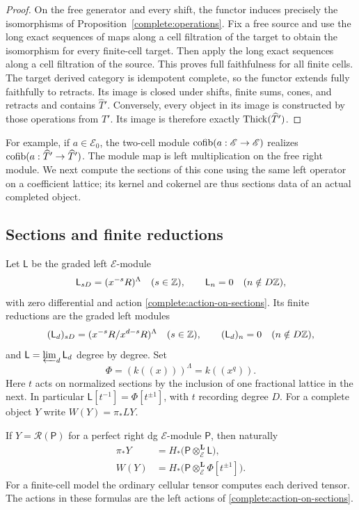 \begin{proof}
On the free generator and every shift, the functor induces precisely
the isomorphisms of Proposition~\ref{complete:operations}. Fix a free
source and use the long exact sequences of maps along a cell filtration
of the target to obtain the isomorphism for every finite-cell target.
Then apply the long exact sequences along a cell filtration of the
source. This proves full faithfulness for all finite cells.
The target derived category is idempotent complete, so the functor
extends fully faithfully to retracts. Its image is closed under shifts,
finite sums, cones, and retracts and contains $\widehat T'$. Conversely,
every object in its image is constructed by those operations from
$\widehat T'$. Its image is therefore exactly
$\operatorname{Thick}(\widehat T')$.
\end{proof}

For example, if $a\in\mathscr E_0$, the two-cell module
$\operatorname{cofib}(a:\mathscr E\to\mathscr E)$ realizes
$\operatorname{cofib}(a:\widehat T'\to\widehat T')$. The module map is left
multiplication on the free right module. We next compute the sections
of this cone using the same left operator on a coefficient lattice;
its kernel and cokernel are thus sections data of an actual completed
object.

\subsection{Sections and finite reductions}

Let $\mathsf L$ be the graded left $\mathscr E$-module
\begin{equation}
\label{complete:section-module}
 \mathsf L_{sD}=(x^{-s}R)^\Lambda\quad(s\in\mathbb Z),
 \qquad \mathsf L_n=0\quad(n\notin D\mathbb Z),
\end{equation}
with zero differential and action
\eqref{complete:action-on-sections}. Its finite reductions are the
graded left modules
\[
 (\mathsf L_d)_{sD}=(x^{-s}R/x^{d-s}R)^\Lambda\quad(s\in\mathbb Z),
 \qquad (\mathsf L_d)_n=0\quad(n\notin D\mathbb Z),
\]
and $\mathsf L=\varprojlim_d\mathsf L_d$ degree by degree. Set
\[
 \Phi=(k((x)))^\Lambda=k((x^q)).
\]
Here $t$ acts on normalized sections by the inclusion of one
fractional lattice in the next. In particular
$\mathsf L[t^{-1}]=\Phi[t^{\pm1}]$, with $t$ recording degree
$D$. For a complete object $Y$ write $W(Y)=\pi_*LY$.

\begin{proposition}
\label{complete:sections}
If $Y=\mathcal R(\mathsf P)$ for a perfect right dg
$\mathscr E$-module $\mathsf P$, then naturally
\begin{equation}
\label{complete:tensor-formulas}
 \begin{split}
 \pi_*Y&=H_*\bigl(\mathsf P\otimes^{\mathbf L}_{\mathscr E}
                           \mathsf L\bigr),\\
 W(Y)&=H_*\bigl(\mathsf P\otimes^{\mathbf L}_{\mathscr E}
                           \Phi[t^{\pm1}]\bigr).
 \end{split}
\end{equation}
For a finite-cell model the ordinary cellular tensor computes each
derived tensor. The actions in these formulas are the left actions
of \eqref{complete:action-on-sections}.
\end{proposition}

